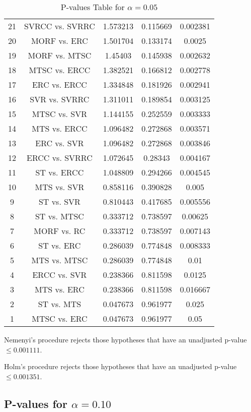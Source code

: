 \documentclass[a4paper,10pt]{article}
\begin{document}
\begin{landscape}
\begin{table}[!htp]
\begin{tabular}{ccccc}
21&SVRCC vs. SVRRC&1.573213&0.115669&0.002381\\
20&MORF vs. ERC&1.501704&0.133174&0.0025\\
19&MORF vs. MTSC&1.45403&0.145938&0.002632\\
18&MTSC vs. ERCC&1.382521&0.166812&0.002778\\
17&ERC vs. ERCC&1.334848&0.181926&0.002941\\
16&SVR vs. SVRRC&1.311011&0.189854&0.003125\\
15&MTSC vs. SVR&1.144155&0.252559&0.003333\\
14&MTS vs. ERCC&1.096482&0.272868&0.003571\\
13&ERC vs. SVR&1.096482&0.272868&0.003846\\
12&ERCC vs. SVRRC&1.072645&0.28343&0.004167\\
11&ST vs. ERCC&1.048809&0.294266&0.004545\\
10&MTS vs. SVR&0.858116&0.390828&0.005\\
9&ST vs. SVR&0.810443&0.417685&0.005556\\
8&ST vs. MTSC&0.333712&0.738597&0.00625\\
7&MORF vs. RC&0.333712&0.738597&0.007143\\
6&ST vs. ERC&0.286039&0.774848&0.008333\\
5&MTS vs. MTSC&0.286039&0.774848&0.01\\
4&ERCC vs. SVR&0.238366&0.811598&0.0125\\
3&MTS vs. ERC&0.238366&0.811598&0.016667\\
2&ST vs. MTS&0.047673&0.961977&0.025\\
1&MTSC vs. ERC&0.047673&0.961977&0.05\\
\hline
\end{tabular}
\caption{P-values Table for $\alpha=0.05$}
\end{table}Nemenyi's procedure rejects those hypotheses that have an unadjusted p-value $\le0.001111$.

Holm's procedure rejects those hypotheses that have an unadjusted p-value $\le0.001351$.

\pagebreak

\subsection{P-values for $\alpha=0.10$}


\end{landscape}
\end{document}

